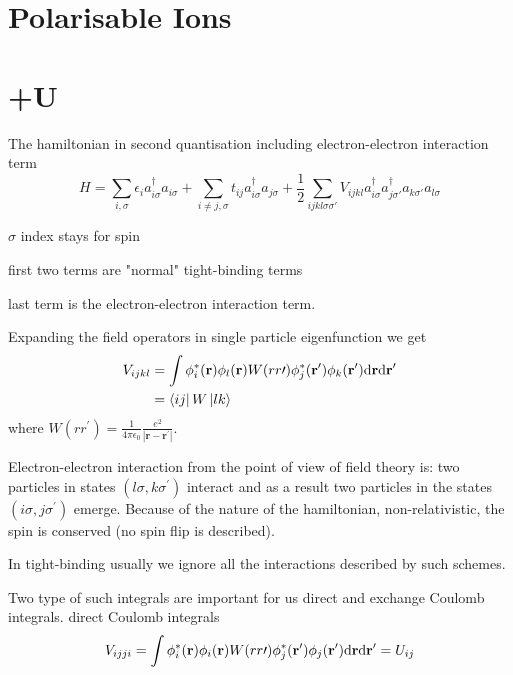\section{Polarisable Ions}
\section{+U}
\par{The hamiltonian in second quantisation including electron-electron interaction term}
\begin{equation}
H=\sum_{i,\sigma}\epsilon_ia_{i\sigma}^{\dag}a_{i\sigma}+\sum_{i\neq j,\sigma}t_{ij}a_{i\sigma}^{\dag}a_{j\sigma}+\frac{1}{2}\sum_{ijkl\sigma \sigma{\prime}}
V_{ijkl}a_{i\sigma}^{\dag}a_{j\sigma\prime}^{\dag}a_{k\sigma\prime}a_{l\sigma}
\end{equation}
\par{$\sigma$ index stays for spin}
\par{first two terms are "normal" tight-binding terms}
\par{last term is the electron-electron interaction term.}
\par{Expanding the field operators in single particle eigenfunction we get}
\begin{equation}
\begin{split}
V_{ijkl}&=\int\phi_{i}^{*}({\bf r})\phi_{l}({\bf r})W(rr\prime)\phi_{j}^{*}({\bf r^\prime})\phi_{k}({\bf r^\prime})\text{d}{\bf r}\text{d}{\bf r^\prime}\\
&=\mathinner{\langle{ij}|}W\mathinner{|{lk}\rangle}
\end{split}
\end{equation}
where $W(rr^\prime)=\frac{1}{4\pi\epsilon_0}\frac{e^2}{|\bm{r}-\bm{r^\prime}|}$.
\par{Electron-electron interaction from the point of view of field theory is: two particles in states $(l\sigma,k\sigma^\prime)$ interact and as a result two particles
in the states $(i\sigma,j\sigma^\prime)$ emerge. Because of the nature of the hamiltonian, non-relativistic, the spin is conserved (no spin flip is described).}
\par{In tight-binding usually we ignore all the interactions described by such schemes.}
\par{Two type of such integrals are important for us direct and exchange Coulomb integrals.}
direct Coulomb integrals
\begin{equation}
\label{udef}
V_{ijji}=\int\phi_{i}^{*}({\bf r})\phi_{i}({\bf r})W(rr\prime)\phi_{j}^{*}({\bf r^\prime})\phi_{j}({\bf r^\prime})\text{d}{\bf r}\text{d}{\bf r^\prime}=U_{ij}
\end{equation}
